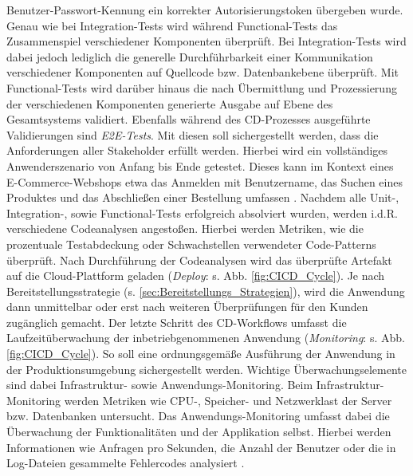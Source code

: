 Benutzer-Passwort-Kennung ein korrekter Autorisierungstoken übergeben wurde. Genau wie bei Integration-Tests wird während Functional-Tests das Zusammenspiel verschiedener Komponenten überprüft. Bei Integration-Tests wird dabei jedoch lediglich die generelle Durchführbarkeit einer Kommunikation verschiedener Komponenten auf Quellcode bzw. Datenbankebene überprüft. Mit Functional-Tests wird darüber hinaus die nach Übermittlung und Prozessierung der verschiedenen Komponenten generierte Ausgabe auf Ebene des Gesamtsystems validiert. Ebenfalls während des CD-Prozesses ausgeführte Validierungen sind \textit{\ac{E2E-Tests}}. Mit diesen soll sichergestellt werden, dass die Anforderungen aller Stakeholder erfüllt werden. Hierbei wird ein vollständiges Anwenderszenario von Anfang bis Ende getestet. Dieses kann im Kontext eines E-Commerce-Webshops etwa das Anmelden mit Benutzername, das Suchen eines Produktes und das Abschließen einer Bestellung umfassen \cite{Bose.20230220}. Nachdem alle Unit-, Integration-, sowie Functional-Tests erfolgreich absolviert wurden, werden i.d.R. verschiedene Codeanalysen angestoßen. Hierbei werden Metriken, wie die prozentuale Testabdeckung oder Schwachstellen verwendeter Code-Patterns überprüft. Nach Durchführung der Codeanalysen wird das überprüfte Artefakt auf die Cloud-Plattform geladen (\textit{Deploy}: s. Abb. \ref*{fig:CICD_Cycle}). Je nach Bereitstellungsstrategie (s. \ref*{sec:Bereitstellungs_Strategien}), wird die Anwendung dann unmittelbar oder erst nach weiteren Überprüfungen für den Kunden zugänglich gemacht. Der letzte Schritt des CD-Workflows umfasst die Laufzeitüberwachung der inbetriebgenommenen Anwendung (\textit{Monitoring}: s. Abb. \ref*{fig:CICD_Cycle}). So soll eine ordnungsgemäße Ausführung der Anwendung in der Produktionsumgebung sichergestellt werden. Wichtige Überwachungselemente sind dabei Infrastruktur- sowie Anwendungs-Monitoring. Beim Infrastruktur-Monitoring werden Metriken wie CPU-, Speicher- und Netzwerklast der Server bzw. Datenbanken untersucht. Das Anwendungs-Moni\-toring umfasst dabei die Überwachung der Funktionalitäten und der Applikation selbst. Hierbei werden Informationen wie Anfragen pro Sekunden, die Anzahl der Benutzer oder die in Log-Dateien gesammelte Fehlercodes analysiert \cite[21]{Halstenberg.2020}. 

